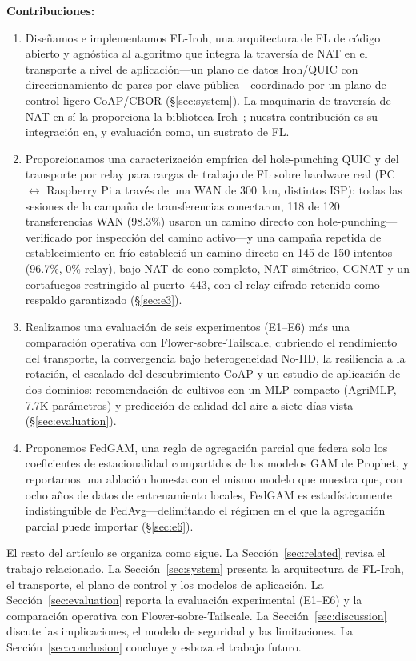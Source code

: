 \documentclass[journal]{IEEEtran}
\begin{document}
\noindent\textbf{Contribuciones:}
\begin{enumerate}
    \item Diseñamos e implementamos FL-Iroh, una arquitectura de FL de código abierto y agnóstica al algoritmo que integra la traversía de NAT en el transporte a nivel de aplicación---un plano de datos Iroh/QUIC con direccionamiento de pares por clave pública---coordinado por un plano de control ligero CoAP/CBOR (\S\ref{sec:system}). La maquinaria de traversía de NAT en sí la proporciona la biblioteca Iroh~\cite{iroh2024}; nuestra contribución es su integración en, y evaluación como, un sustrato de FL.
    \item Proporcionamos una caracterización empírica del hole-punching QUIC y del transporte por relay para cargas de trabajo de FL sobre hardware real (PC $\leftrightarrow$ Raspberry Pi a través de una WAN de 300~km, distintos ISP): todas las sesiones de la campaña de transferencias conectaron, 118 de 120 transferencias WAN (98.3\%) usaron un camino directo con hole-punching---verificado por inspección del camino activo---y una campaña repetida de establecimiento en frío estableció un camino directo en 145 de 150 intentos (96.7\%, 0\% relay), bajo NAT de cono completo, NAT simétrico, CGNAT y un cortafuegos restringido al puerto~443, con el relay cifrado retenido como respaldo garantizado (\S\ref{sec:e3}).
    \item Realizamos una evaluación de seis experimentos (E1--E6) más una comparación operativa con Flower-sobre-Tailscale, cubriendo el rendimiento del transporte, la convergencia bajo heterogeneidad No-IID, la resiliencia a la rotación, el escalado del descubrimiento CoAP y un estudio de aplicación de dos dominios: recomendación de cultivos con un MLP compacto (AgriMLP, 7.7K parámetros) y predicción de calidad del aire a siete días vista (\S\ref{sec:evaluation}).
    \item Proponemos FedGAM, una regla de agregación parcial que federa solo los coeficientes de estacionalidad compartidos de los modelos GAM de Prophet, y reportamos una ablación honesta con el mismo modelo que muestra que, con ocho años de datos de entrenamiento locales, FedGAM es estadísticamente indistinguible de FedAvg---delimitando el régimen en el que la agregación parcial puede importar (\S\ref{sec:e6}).
\end{enumerate}

El resto del artículo se organiza como sigue. La Sección~\ref{sec:related} revisa el trabajo relacionado. La Sección~\ref{sec:system} presenta la arquitectura de FL-Iroh, el transporte, el plano de control y los modelos de aplicación. La Sección~\ref{sec:evaluation} reporta la evaluación experimental (E1--E6) y la comparación operativa con Flower-sobre-Tailscale. La Sección~\ref{sec:discussion} discute las implicaciones, el modelo de seguridad y las limitaciones. La Sección~\ref{sec:conclusion} concluye y esboza el trabajo futuro.
\end{document}
